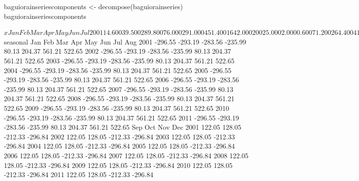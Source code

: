\documentclass{article}\usepackage{graphicx, color}
\begin{document}
\begin{center}
\begin{Schunk}
\begin{Sinput}
baguiorainseriescomponents <- decompose(baguiorainseries)
baguiorainseriescomponents
\end{Sinput}
\begin{Soutput}
$x
          Jan      Feb      Mar      Apr      May      Jun      Jul
2001   14.600   39.500  289.800   76.000  291.000  451.400 1642.000
2002    5.000    2.000    0.600   71.200  264.400  411.000 1883.400
2003    9.800   25.400    4.800   46.800  662.700  792.400  721.300
2004   17.000  128.600   79.870   37.800  428.600 1306.500  445.400
2005    0.200    0.000   54.600   32.000  291.000  425.700  292.400
2006  160.600    8.800   38.400   29.600  327.509  188.200 1769.800
2007    0.000    0.600   31.800   25.400  308.600  358.400  219.000
2008   24.000   97.000   78.700  149.800  839.800  302.000  681.200
2009    8.000   64.500   82.900  407.300  298.500  810.000  758.400
2010   10.037    5.499   15.300  148.600  248.600  254.000  543.700
2011   94.000   13.800   88.900   11.900  462.500  529.100  435.900
          Aug      Sep      Oct      Nov      Dec
2001  274.000  842.200   97.000   61.600   23.200
2002  525.600  301.500  224.800   67.300   10.000
2003 1089.400  303.200  179.700   60.400    4.400
2004 1432.900  225.600   42.400  114.500  154.900
2005  690.200  694.600  256.600   55.200   68.000
2006  735.800  207.600  316.000   72.400   43.200
2007 1201.600  408.400  410.300  444.800   21.600
2008  999.500  761.000  178.100   82.600    0.000
2009 1087.700  516.900 1981.800   22.200    0.000
2010  536.600  296.800  920.100  226.400   47.400
2011 1096.300  819.200  332.400   81.600   67.400

$seasonal
         Jan     Feb     Mar     Apr     May     Jun     Jul     Aug
2001 -296.55 -293.19 -283.56 -235.99   80.13  204.37  561.21  522.65
2002 -296.55 -293.19 -283.56 -235.99   80.13  204.37  561.21  522.65
2003 -296.55 -293.19 -283.56 -235.99   80.13  204.37  561.21  522.65
2004 -296.55 -293.19 -283.56 -235.99   80.13  204.37  561.21  522.65
2005 -296.55 -293.19 -283.56 -235.99   80.13  204.37  561.21  522.65
2006 -296.55 -293.19 -283.56 -235.99   80.13  204.37  561.21  522.65
2007 -296.55 -293.19 -283.56 -235.99   80.13  204.37  561.21  522.65
2008 -296.55 -293.19 -283.56 -235.99   80.13  204.37  561.21  522.65
2009 -296.55 -293.19 -283.56 -235.99   80.13  204.37  561.21  522.65
2010 -296.55 -293.19 -283.56 -235.99   80.13  204.37  561.21  522.65
2011 -296.55 -293.19 -283.56 -235.99   80.13  204.37  561.21  522.65
         Sep     Oct     Nov     Dec
2001  122.05  128.05 -212.33 -296.84
2002  122.05  128.05 -212.33 -296.84
2003  122.05  128.05 -212.33 -296.84
2004  122.05  128.05 -212.33 -296.84
2005  122.05  128.05 -212.33 -296.84
2006  122.05  128.05 -212.33 -296.84
2007  122.05  128.05 -212.33 -296.84
2008  122.05  128.05 -212.33 -296.84
2009  122.05  128.05 -212.33 -296.84
2010  122.05  128.05 -212.33 -296.84
2011  122.05  128.05 -212.33 -296.84


\end{Soutput}
\end{Schunk}
\end{center}
\end{document}
